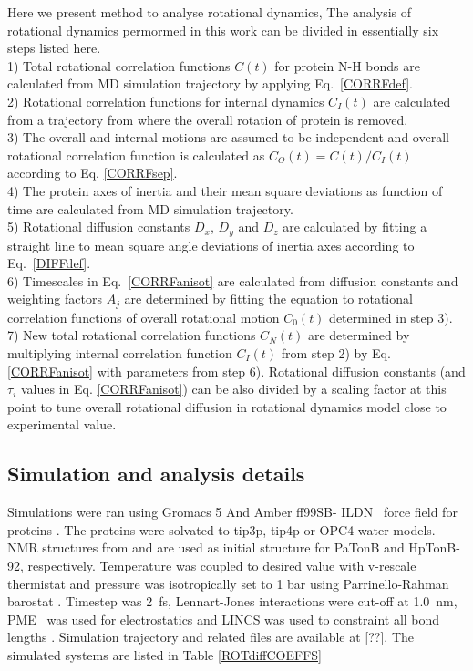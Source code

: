 \documentclass[pre,aps,floatfix,authordate1-4,twocolumn]{revtex4-1}
\begin{document}
Here we present method to analyse rotational dynamics,
The analysis of rotational dynamics permormed in this work can be
divided in essentially six steps listed here. \\
1) Total rotational correlation functions $C(t)$
for protein N-H bonds are calculated from MD simulation trajectory
by applying Eq.~\ref{CORRFdef}. \\
2) Rotational correlation functions for internal
dynamics $C_I(t)$ are calculated from a trajectory from where the overall
rotation of protein is removed. \\
3) The overall and internal motions are assumed to be independent and overall
rotational correlation function is calculated as $C_O(t)=C(t)/C_I(t)$ according to Eq. \ref{CORRFsep}. \\
4) The protein axes of inertia and their mean square deviations as function of
time are calculated from MD simulation trajectory. \\
5) Rotational diffusion constants $D_x$, $D_y$ and $D_z$ are calculated by fitting a straight line
to mean square angle deviations of inertia axes according to Eq.~\ref{DIFFdef}. \\
6) Timescales in Eq.~\ref{CORRFanisot} are calculated from diffusion constants and
weighting factors $A_j$ are determined by fitting the equation to
rotational correlation functions of overall rotational motion $C_0(t)$ determined in step 3). \\
7) New total rotational correlation functions $C_N(t)$ are determined by multiplying
internal correlation function $C_I(t)$ from step 2) by Eq. \ref{CORRFanisot} with
parameters from step 6). Rotational diffusion constants (and $\tau_i$ values in Eq. \ref{CORRFanisot})
can be also divided by a scaling factor at this point to tune overall
rotational diffusion in rotational dynamics model close to experimental value.



\subsection{Simulation and analysis details}
Simulations were ran using Gromacs 5 \cite{abraham15} And Amber ff99SB- ILDN~\cite{lindorff10}
force field for proteins . The proteins were solvated
to tip3p\cite{jorgensen83}, tip4p \cite{jorgensen83} or OPC4 \cite{izadi14} water models.
NMR structures from \cite{??} and \cite{ciragan16} are used as initial structure for 
PaTonB and HpTonB-92, respectively.
Temperature was coupled to desired value with v-rescale thermistat \cite{bussi07} and pressure was 
isotropically set to 1 bar using Parrinello-Rahman barostat \cite{parrinello81}.
Timestep was 2~fs, Lennart-Jones interactions were cut-off at 1.0~nm,
PME~\cite{darden93,essman95} was used for electrostatics and LINCS was used
to constraint all bond lengths \cite{hess07}. Simulation trajectory and related
files are available at [??].
The simulated systems are listed
in Table \ref{ROTdiffCOEFFS}
\end{document}
